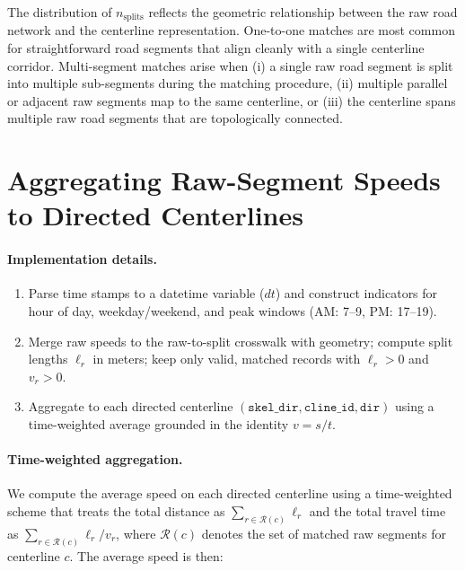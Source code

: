 \documentclass[12pt]{article}
\begin{document}
	The distribution of $n_{\text{splits}}$ reflects the geometric relationship between
	the raw road network and the centerline representation. One-to-one matches are most
	common for straightforward road segments that align cleanly with a single
	centerline corridor. Multi-segment matches arise when (i) a single raw road
	segment is split into multiple sub-segments during the matching procedure, (ii)
	multiple parallel or adjacent raw segments map to the same centerline, or (iii) the
	centerline spans multiple raw road segments that are topologically connected.

		\clearpage

	\section{Aggregating Raw-Segment Speeds to Directed Centerlines}
	
	\paragraph{Implementation details.}
	
	\begin{enumerate}
		\item Parse time stamps to a datetime variable ($dt$) and construct indicators for hour of day, weekday/weekend, and peak windows (AM: 7--9, PM: 17--19).
		
		\item Merge raw speeds to the raw-to-split crosswalk with geometry; compute split lengths $\ell_r$ in meters; keep only valid, matched records with $\ell_r>0$ and $v_r>0$.
		
		\item Aggregate to each directed centerline $(\texttt{skel\_dir}, \texttt{cline\_id}, \texttt{dir})$ using a time-weighted average grounded in the identity $v=s/t$.
	\end{enumerate}
	
	\paragraph{Time-weighted aggregation.}
	
	We compute the average speed on each directed centerline using a time-weighted scheme that treats the total distance as $\sum_{r \in \mathcal{R}(c)} \ell_r$ and the total travel time as $\sum_{r \in \mathcal{R}(c)} \ell_r / v_r$, where $\mathcal{R}(c)$ denotes the set of matched raw segments for centerline $c$. The average speed is then:
	
\end{document}

